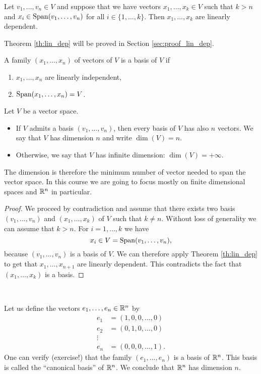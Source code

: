 \documentclass[11pt,nocut]{article}
\begin{document}
\begin{theorem}\label{th:lin_dep}
	Let $v_1, \dots, v_n \in V$ and suppose that we have vectors $x_1, \dots, x_k \in V$ such that $k > n$ and $x_i \in {{\rm Span}}(v_1, \dots, v_n)$ for all $i \in \{1, \dots, k\}$.
	Then $x_1, \dots, x_k$ are linearly dependent.
\end{theorem}
Theorem \ref{th:lin_dep} will be proved in Section \ref{sec:proof_lin_dep}.
\\

\begin{definition}[Basis]
	A family $(x_1, \dots, x_n)$ of vectors of $V$ is a basis of $V$ if
	\begin{enumerate}[label=(\roman*)]
		\item $x_1, \dots, x_n$ are linearly independent,
		\item ${{\rm Span}}(x_1, \dots, x_n) = V$.
	\end{enumerate}
\end{definition}

\begin{definition}[Dimension]
	Let $V$ be a vector space.
	\begin{itemize}
		\item If $V$ admits a basis $(v_1, \dots, v_n)$, then every basis of $V$ has also $n$ vectors. We say that $V$ has dimension $n$ and write $\dim(V) = n$.
		\item Otherwise, we say that $V$ has infinite dimension: $\dim(V) = +\infty$.
	\end{itemize}
\end{definition}
The dimension is therefore the minimum number of vector needed to span the vector space.
In this course we are going to focus mostly on finite dimensional spaces and $\mathbb{R}^n$ in particular.
\\
\begin{proof}
	We proceed by contradiction and assume that there exists two basis $(v_1, \dots, v_n)$ and $(x_1, \dots, x_k)$ of $V$ such that $k \neq n$. Without loss of generality we can assume that $k > n$. For $i = 1, \dots, k$ we have
	$$
	x_i \in V = {{\rm Span}}(v_1, \dots, v_n),
	$$
	because $(v_1, \dots, v_n)$ is a basis of $V$. We can therefore apply Theorem \ref{th:lin_dep} to get that $x_1, \dots, x_{n+1}$ are linearly dependent. This contradicts the fact that $(x_1, \dots, x_{k})$ is a basis.
\end{proof}
\\

\begin{example}
	Let us define the vectors $e_1, \dots, e_n \in \mathbb{R}^n$ by
	\begin{align*}
		e_1 &= (1, 0, 0, \dots, 0) \\
		e_2 &= (0, 1, 0, \dots, 0) \\
		\vdots & \\
		e_n &= (0, 0, 0, \dots, 1).
	\end{align*}
	One can verify (exercise!) that the family $(e_1, \dots, e_n)$ is a basis of $\mathbb{R}^n$. This basis is called the ``canonical basis'' of $\mathbb{R}^n$. We conclude that $\mathbb{R}^n$ has dimension $n$.
\end{example}
\vspace{2mm}
\end{document}

